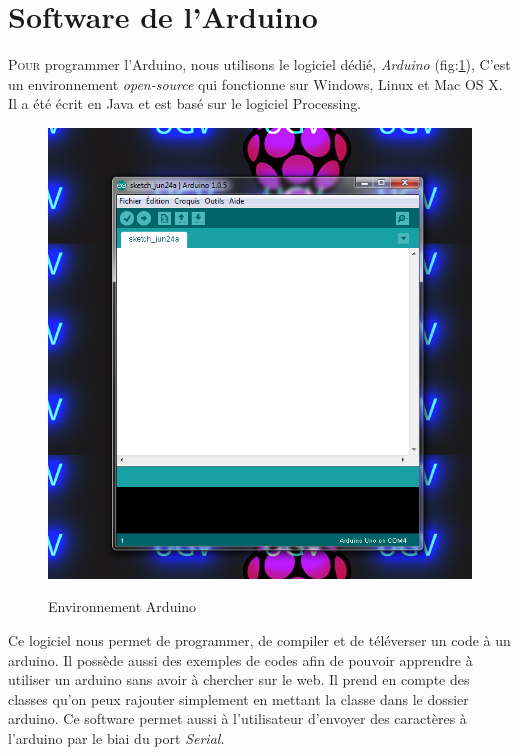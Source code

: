 \documentclass[a4paper,11pt]{report}
\begin{document}
{\section{Software de l'Arduino}
\lettrine{P}{our} programmer l'Arduino, nous utilisons le logiciel dédié, \textit{Arduino} (fig:\ref{Environnement Arduino}), C'est un environnement \textit{open-source} qui fonctionne sur Windows, Linux et Mac OS X. Il a été écrit en Java et est basé sur le logiciel Processing.
\begin{figure}[h!]
\begin{center}
\includegraphics[scale=0.5]{arduino-environnement-1}\\
\caption{Environnement Arduino\label{Environnement Arduino}}
\end{center}
\end{figure}
Ce logiciel nous permet de programmer, de compiler et de téléverser un code à un arduino. Il possède aussi des exemples de codes afin de pouvoir apprendre à utiliser un arduino sans avoir à chercher sur le web. Il prend en compte des classes qu'on peux rajouter simplement en mettant la classe dans le dossier arduino. Ce software permet aussi à l'utilisateur d'envoyer des caractères à l'arduino par le biai du port \textit{Serial}. 



}
\end{document}
